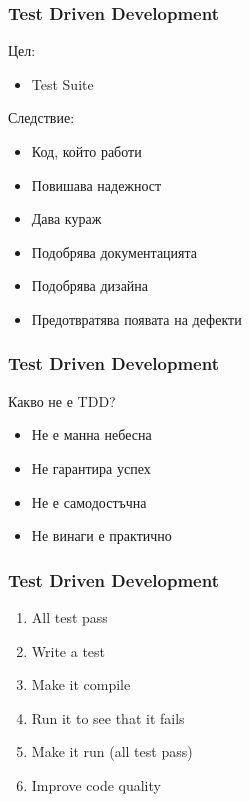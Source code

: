 \begin{frame}
  \frametitle{Test Driven Development}
    \begin{minipage}[t]{0.28\linewidth}
        Цел:
        \begin{itemize}
            \item Test Suite
        \end{itemize}
    \end{minipage}\hfill
    \begin{minipage}[t]{0.68\linewidth}
        Следствие:
        \begin{itemize}
            \item Код, който работи
            \item Повишава надежност 
            \item Дава кураж
            \item Подобрява документацията
            \item Подобрява дизайна
            \item Предотвратява появата на дефекти
        \end{itemize}
    \end{minipage}
\end{frame}

\begin{frame}
  \frametitle{Test Driven Development}
  Какво не е TDD?
  \begin{itemize}
    \item Не е манна небесна
    \item Не гарантира успех
    \item Не е самодостъчна
    \item Не винаги е практично
  \end{itemize}
\end{frame}

\begin{frame}
  \frametitle{Test Driven Development}
  \begin{enumerate} 
    \item All test pass
    \item Write a test
    \item Make it compile
    \item Run it to see that it fails
    \item Make it run (all test pass)
    \item Improve code quality
  \end{enumerate} 
\end{frame}
